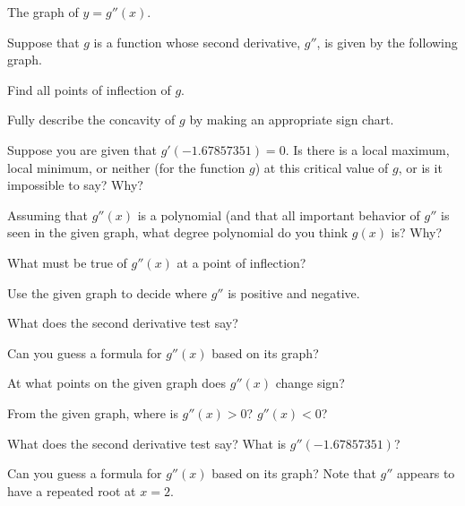\begin{marginfigure}
\caption{The graph of $y = g''(x)$.} \label{F:3.1.Act2}
\end{marginfigure}

\begin{activity} \label{A:3.1.2}  Suppose that $g$ is a function whose second derivative, $g''$, is given by the following graph.

\ba 
  \item Find all points of inflection of $g$. 
  \item Fully describe the concavity of $g$ by making an appropriate sign chart.  
  \item Suppose you are given that $g'(-1.67857351) = 0$.  Is there is a local maximum, local minimum, or neither (for the function $g$) at this critical value of $g$, or is it impossible to say?  Why?
  \item Assuming that $g''(x)$ is a polynomial (and that all important behavior of $g''$ is seen in the given graph, what degree polynomial do you think $g(x)$ is?  Why?
\ea
\end{activity}
\begin{smallhint}
\ba 
  \item What must be true of $g''(x)$ at a point of inflection?
  \item Use the given graph to decide where $g''$ is positive and negative.
  \item What does the second derivative test say?
  \item Can you guess a formula for $g''(x)$ based on its graph?
\ea
\end{smallhint}
\begin{bighint}
\ba 
  \item At what points on the given graph does $g''(x)$ change sign?
  \item From the given graph, where is $g''(x) > 0$?  $g''(x) < 0$?
  \item What does the second derivative test say?  What is $g''(-1.67857351)$?
  \item Can you guess a formula for $g''(x)$ based on its graph?  Note that $g''$ appears to have a repeated root at $x = 2$.
\ea
\end{bighint}
